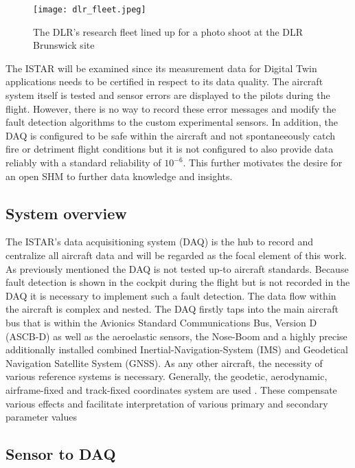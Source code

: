 \begin{figure}
    \centering
    \texttt{[image: dlr\_fleet.jpeg]}
    \caption{The DLR's research fleet \cite{dlr_dlr-fleet_2018} lined up for a photo shoot at the DLR Brunswick site}
    \label{fig:dlr_fleet}
\end{figure}

The ISTAR will be examined since its measurement data for Digital Twin applications needs to be certified in respect to its data quality. The aircraft system itself is tested and sensor errors are displayed to the pilots during the flight. However, there is no way to record these error messages and modify the fault detection algorithms to the custom experimental sensors. In addition, the DAQ is configured to be safe within the aircraft and not spontaneeously catch fire or detriment flight conditions but it is not configured to also provide data reliably with a standard reliability of $10^{-6}$. This further motivates the desire for an open SHM to further data knowledge and insights.

\subsection{System overview}

The ISTAR's data acquisitioning system (DAQ) is the hub to record and centralize all aircraft data and will be regarded as the focal element of this work. As previously mentioned the DAQ is not tested up-to aircraft standards. Because fault detection is shown in the cockpit during the flight but is not recorded in the DAQ it is necessary to implement such a fault detection. The data flow within the aircraft is complex and nested. The DAQ firstly taps into the main aircraft bus that is within the Avionics Standard Communications Bus, Version D (ASCB-D) as well as the aeroelastic sensors, the Nose-Boom and a highly precise additionally installed combined Inertial-Navigation-System (IMS) and Geodetical Navigation Satellite System (GNSS). As any other aircraft, the necessity of various reference systems is necessary. Generally, the geodetic, aerodynamic, airframe-fixed and track-fixed coordinates system are used \cite{brockhaus_flugregelung_2011}. These compensate various effects and facilitate interpretation of various primary and secondary parameter values

\subsection{Sensor to DAQ}

